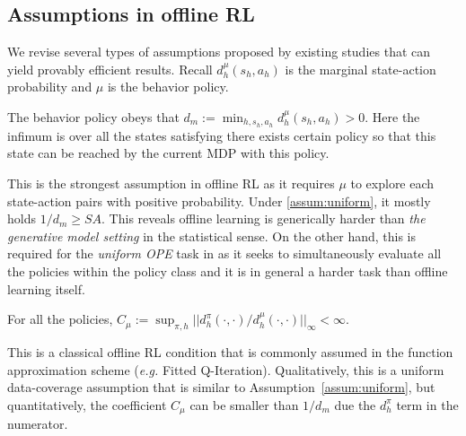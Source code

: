 \subsection{Assumptions in offline RL}

We revise several types of assumptions proposed by existing studies that can yield provably efficient results. Recall $d^\mu_h(s_h,a_h)$ is the marginal state-action probability and $\mu$ is the behavior policy.

\begin{assumption}\label{assum:uniform}
	The behavior policy obeys that $d_m:=\min_{h,s_h,a_h} d_h^\mu (s_h,a_h) > 0$. Here the infimum is over all the states satisfying there exists certain policy so that this state can be reached by the current MDP with this policy. 
\end{assumption}
This is the strongest assumption in offline RL as it requires $\mu$ to explore each state-action pairs with positive probability. Under \ref{assum:uniform}, it mostly holds $1/d_m\geq SA$. This reveals offline learning is generically harder than \emph{the generative model setting} \citep{agarwal2020model} in the statistical sense. On the other hand, this is required for the \emph{uniform OPE} task in \cite{yin2021near} as it seeks to simultaneously evaluate all the policies within the policy class and it is in general a harder task than offline learning itself.  


\begin{assumption}\label{assum:concen}
	For all the policies, $C_\mu:=\sup_{\pi,h} ||d^\pi_h(\cdot,\cdot)/d^\mu_h(\cdot,\cdot)||_\infty<\infty$.
\end{assumption}

This is a classical offline RL condition that is commonly assumed in the function approximation scheme (\emph{e.g.} Fitted Q-Iteration). Qualitatively, this is a uniform data-coverage assumption that is similar to Assumption~\ref{assum:uniform}, but quantitatively, the coefficient $C_\mu$ can be smaller than $1/d_m$ due the $d^\pi_h$ term in the numerator. 

